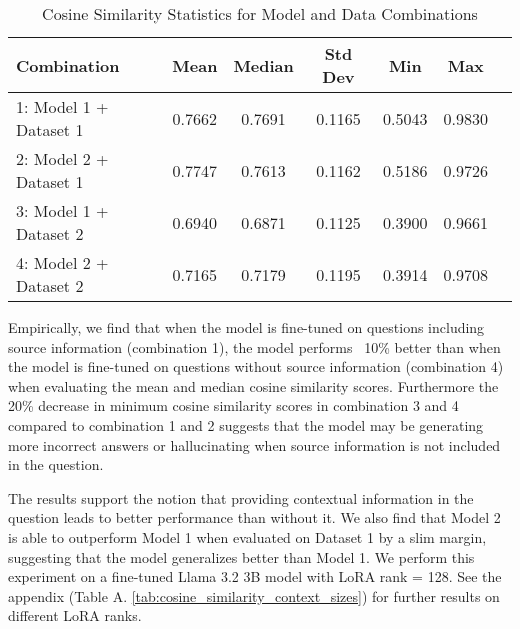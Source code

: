 \begin{table}[h!]
\centering
\caption{Cosine Similarity Statistics for Model and Data Combinations}
\label{tab:cosine_similarity}
\begin{tabular}{lcccccc}
\hline
\textbf{Combination} & \textbf{Mean} & \textbf{Median} & \textbf{Std Dev} & \textbf{Min} & \textbf{Max} \\
\hline
1: Model 1 + Dataset 1 & 0.7662 & 0.7691 & 0.1165 & 0.5043 & 0.9830 \\
2: Model 2 + Dataset 1 & 0.7747 & 0.7613 & 0.1162 & 0.5186 & 0.9726 \\
3: Model 1 + Dataset 2 & 0.6940 & 0.6871 & 0.1125 & 0.3900 & 0.9661 \\
4: Model 2 + Dataset 2 & 0.7165 & 0.7179 & 0.1195 & 0.3914 & 0.9708 \\
\hline
\end{tabular}
\end{table}

Empirically, we find that when the model is fine-tuned on questions including source information (combination 1),
the model performs ~10\% better than when the model is fine-tuned on questions without source information (combination 4)
when evaluating the mean and median cosine similarity scores. Furthermore the 20\% decrease in minimum cosine
similarity scores in combination 3 and 4 compared to combination 1 and 2 suggests that the model may be generating
more incorrect answers or hallucinating when source information is not included in the question.

The results support the notion that providing contextual information in the
question leads to better performance than without it. We also find that Model 2
is able to outperform Model 1 when evaluated on Dataset 1 by a slim margin,
suggesting that the model generalizes better than Model 1. We perform this
experiment on a fine-tuned Llama 3.2 3B model with LoRA rank = 128. See the
appendix (Table A. \ref{tab:cosine_similarity_context_sizes}) for further
results on different LoRA ranks.

